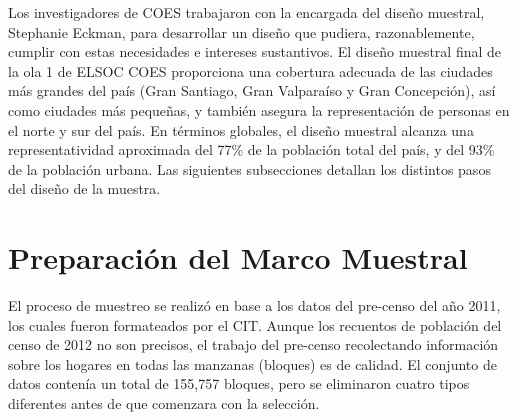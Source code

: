 \documentclass[
]{book}
\begin{document}
Los investigadores de COES trabajaron con la encargada del diseño muestral, Stephanie Eckman, para desarrollar un diseño que pudiera, razonablemente, cumplir con estas necesidades e intereses sustantivos. El diseño muestral final de la ola 1 de ELSOC COES proporciona una cobertura adecuada de las ciudades más grandes del país (Gran Santiago, Gran Valparaíso y Gran Concepción), así como ciudades más pequeñas, y también asegura la representación de personas en el norte y sur del país. En términos globales, el diseño muestral alcanza una representatividad aproximada del 77\% de la población total del país, y del 93\% de la población urbana. Las siguientes subsecciones detallan los distintos pasos del diseño de la muestra.

\hypertarget{preparaciuxf3n-del-marco-muestral}{%
\section{Preparación del Marco Muestral}\label{preparaciuxf3n-del-marco-muestral}}

El proceso de muestreo se realizó en base a los datos del pre-censo del año 2011, los cuales fueron formateados por el CIT. Aunque los recuentos de población del censo de 2012 no son precisos, el trabajo del pre-censo recolectando información sobre los hogares en todas las manzanas (bloques) es de calidad. El conjunto de datos contenía un total de 155,757 bloques, pero se eliminaron cuatro tipos diferentes antes de que comenzara con la selección.
\end{document}
